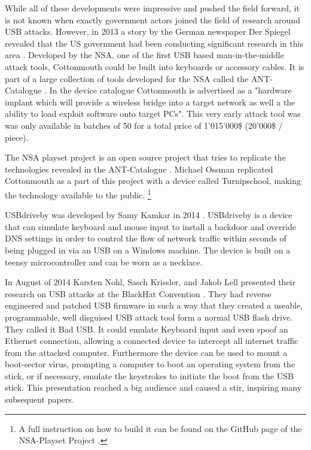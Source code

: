 While all of these developments were impressive and pushed the field forward, it is not known when exactly government actors joined the field of research around USB attacks. However, in 2013 a story by the German newspaper Der Spiegel revealed that the US government had been conducting significant research in this area \cite{appelbaumCatalogRevealsNSA2013}. Developed by the NSA, one of the first USB based man-in-the-middle attack tools, Cottonmouth could be built into keyboards or accessory cables. It is part of a large collection of tools developed for the NSA called the ANT-Catalogue \cite{InteractiveGraphicNSA}. In the device catalogue Cottonmouth is advertised as a "hardware implant which will provide a wireless bridge into a target network as well a the ability to load exploit software onto target PCs". This very early attack tool was was only available in batches of 50 for a total price of 1'015'000\$ (20'000\$ / piece).

The NSA playset project is an open source project that tries to replicate the technologies revealed in the ANT-Catalogue \cite{NSAPlaysetTurnipschoolHtml}. Michael Ossman replicated Cottonmouth as a part of this  project with a device called Turnipschool, making the technology available to the public. \footnote{A full instruction on how to build it can be found on the GitHub page of the NSA-Playset Project \cite{NSAPlaysetTurnipschoolHtml}.}

USBdriveby was developed by Samy Kamkar in 2014 \cite{SamyKamkarUSBdriveby}. USBdriveby is a device that can simulate keyboard and mouse input to install a backdoor and override DNS settings in order to control the flow of network traffic within seconds of being plugged in via an USB on a Windows machine. The device is built on a teensy microcontroller and can be worn as a necklace.

In August of 2014 Karsten Nohl, Sasch Krissler, and Jakob Lell presented their research on USB attacks at the BlackHat Convention \cite{Srlabsbadusbblackhatv1Pdf2014}. They had reverse engineered and patched USB firmware in such a way that they created a useable, programmable, well disguised USB attack tool form a normal USB flash drive. They called it Bad USB. It could emulate Keyboard input and even spoof an Ethernet connection, allowing a connected device to intercept all internet traffic from the attacked computer. Furthermore the device can be used to mount a boot-sector virus, prompting a computer to boot an operating system from the stick, or if necessary, emulate the keystrokes to initiate the boot from the USB stick. This presentation reached a big audience and caused a stir, inspiring many subsequent papers.

